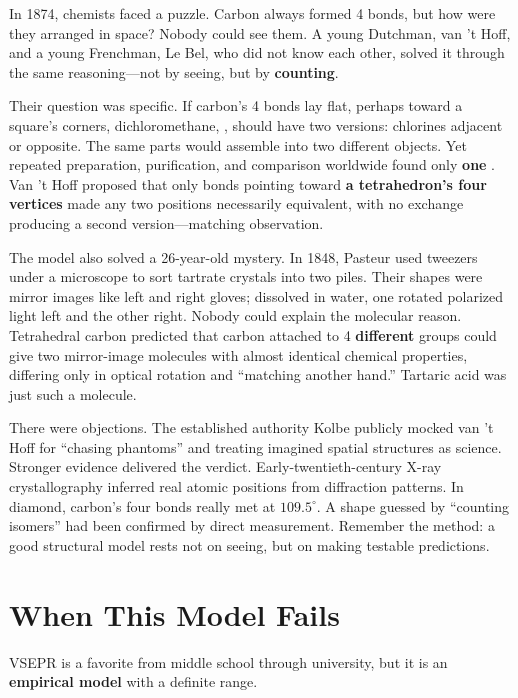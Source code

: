 \begin{zhengju}
In 1874, chemists faced a puzzle. Carbon always formed 4 bonds, but how were they arranged in space? Nobody could see them. A young Dutchman, van 't Hoff, and a young Frenchman, Le Bel, who did not know each other, solved it through the same reasoning---not by seeing, but by \textbf{counting}.

Their question was specific. If carbon's 4 bonds lay flat, perhaps toward a square's corners, dichloromethane, , should have two versions: chlorines adjacent or opposite. The same parts would assemble into two different objects. Yet repeated preparation, purification, and comparison worldwide found only \textbf{one} . Van 't Hoff proposed that only bonds pointing toward \textbf{a tetrahedron's four vertices} made any two positions necessarily equivalent, with no exchange producing a second version---matching observation.

The model also solved a 26-year-old mystery. In 1848, Pasteur used tweezers under a microscope to sort tartrate crystals into two piles. Their shapes were mirror images like left and right gloves; dissolved in water, one rotated polarized light left and the other right. Nobody could explain the molecular reason. Tetrahedral carbon predicted that carbon attached to 4 \textbf{different} groups could give two mirror-image molecules with almost identical chemical properties, differing only in optical rotation and ``matching another hand.'' Tartaric acid was just such a molecule.

There were objections. The established authority Kolbe publicly mocked van 't Hoff for ``chasing phantoms'' and treating imagined spatial structures as science. Stronger evidence delivered the verdict. Early-twentieth-century X-ray crystallography inferred real atomic positions from diffraction patterns. In diamond, carbon's four bonds really met at $109.5^{\circ}$. A shape guessed by ``counting isomers'' had been confirmed by direct measurement. Remember the method: a good structural model rests not on seeing, but on making testable predictions.
\end{zhengju}

\section{When This Model Fails}

VSEPR is a favorite from middle school through university, but it is an \textbf{empirical model} with a definite range.

